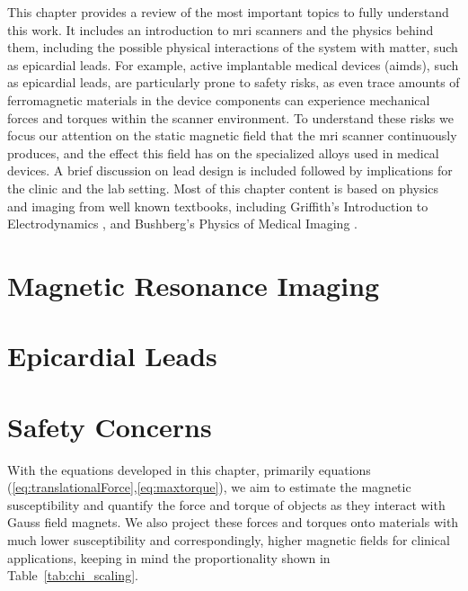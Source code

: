This chapter provides a review of the most important topics to fully understand this work. It includes an introduction to \gls{mri} scanners and the physics behind them, including the possible physical interactions of the system with matter, such as epicardial leads. For example, active implantable medical devices (\glspl{aimd}), such as epicardial leads, are particularly prone to safety risks, as even trace amounts of ferromagnetic materials in the device components can experience mechanical forces and torques within the scanner environment. To understand these risks we focus our attention on the static magnetic field that the \gls{mri} scanner continuously produces, and the effect this field has on the specialized alloys used in medical devices. A brief discussion on lead design is included followed by implications for the clinic and the lab setting. Most of this chapter content is based on physics and imaging from well known textbooks, including Griffith's Introduction to Electrodynamics \cite{griffiths2013electrodynamics}, and Bushberg's Physics of Medical Imaging \cite{bushberg2011}.

\section{Magnetic Resonance Imaging}
\label{sec:mri}
 


\section{Epicardial Leads}
\label{sec:leads}


\section{Safety Concerns}
\label{sec:concerns}
 


With the equations developed in this chapter, primarily equations (\ref{eq:translationalForce},\ref{eq:maxtorque}), we aim to estimate the magnetic susceptibility and quantify the force and torque of objects as they interact with Gauss field magnets. We also project these forces and torques onto materials with much lower susceptibility and correspondingly, higher magnetic fields for clinical applications, keeping in mind the proportionality shown in Table~\ref{tab:chi_scaling}.


